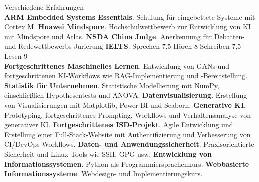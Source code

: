 \begin{rubric}{Verschiedene Erfahrungen}
	\\
	\entry*[2014] \textbf{ARM Embedded Systems Essentials}. Schulung für eingebettete Systeme mit Cortex M.
	\entry*[2006] \textbf{Huawei Mindspore}. Hochschulwettbewerb zur Entwicklung von KI mit Mindspore und Atlas.
	\entry*[2006] \textbf{NSDA China Judge}. Anerkennung für Debatten- und Redewettbewerbs-Jurierung
	\entry*[2006] \textbf{IELTS}. Sprechen 7,5 Hören 8 Schreiben 7,5 Lesen 9
	\\
		\entry*[2025] \textbf{Fortgeschrittenes Maschinelles Lernen}. Entwicklung von GANs und fortgeschrittenen KI-Workflows wie RAG-Implementierung und -Bereitstellung.
		\entry*[2025] \textbf{Statistik für Unternehmen}. Statistische Modellierung mit NumPy, einschließlich Hypothesentests und ANOVA.
		\entry*[2025] \textbf{Datenvisualisierung}. Erstellung von Visualisierungen mit Matplotlib, Power BI und Seaborn.
		\entry*[2025] \textbf{Generative KI}. Prototyping, fortgeschrittenes Prompting, Workflows und Verhaltensanalyse von generativer KI.
		\entry*[2025] \textbf{Fortgeschrittenes ISD-Projekt}. Agile Entwicklung und Erstellung einer Full-Stack-Website mit Authentifizierung und Verbesserung von CI/DevOps-Workflows.
		\entry*[2025] \textbf{Daten- und Anwendungssicherheit}. Praxisorientierte Sicherheit und Linux-Tools wie SSH, GPG usw.
		\entry*[2024] \textbf{Entwicklung von Informationssystemen}. Python als Programmiersprachenkurs.
		\entry*[2024] \textbf{Webbasierte Informationssysteme}. Webdesign- und Implementierungskurs.
\end{rubric}
